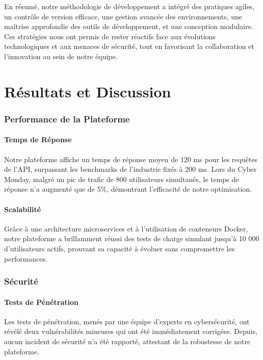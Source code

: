 En résumé, notre méthodologie de développement a intégré des pratiques agiles, un contrôle de version efficace, une gestion avancée des environnements, une maîtrise approfondie des outils de développement, et une conception modulaire. Ces stratégies nous ont permis de rester réactifs face aux évolutions technologiques et aux menaces de sécurité, tout en favorisant la collaboration et l'innovation au sein de notre équipe.
\newpage

\part{Résultats et Discussion}

\section{Performance de la Plateforme}

\subsection{Temps de Réponse}
Notre plateforme affiche un temps de réponse moyen de 120 ms pour les requêtes de l'API, surpassant les benchmarks de l'industrie fixés à 200 ms. Lors du Cyber Monday, malgré un pic de trafic de 800 utilisateurs simultanés, le temps de réponse n'a augmenté que de 5\%, démontrant l'efficacité de notre optimisation.

\subsection{Scalabilité}
Grâce à une architecture microservices et à l'utilisation de conteneurs Docker, notre plateforme a brillamment réussi des tests de charge simulant jusqu'à 10 000 d'utilisateurs actifs, prouvant sa capacité à évoluer sans compromettre les performances.

\section{Sécurité}

\subsection{Tests de Pénétration}
Les tests de pénétration, menés par une équipe d'experts en cybersécurité, ont révélé deux vulnérabilités mineures qui ont été immédiatement corrigées. Depuis, aucun incident de sécurité n'a été rapporté, attestant de la robustesse de notre plateforme.

